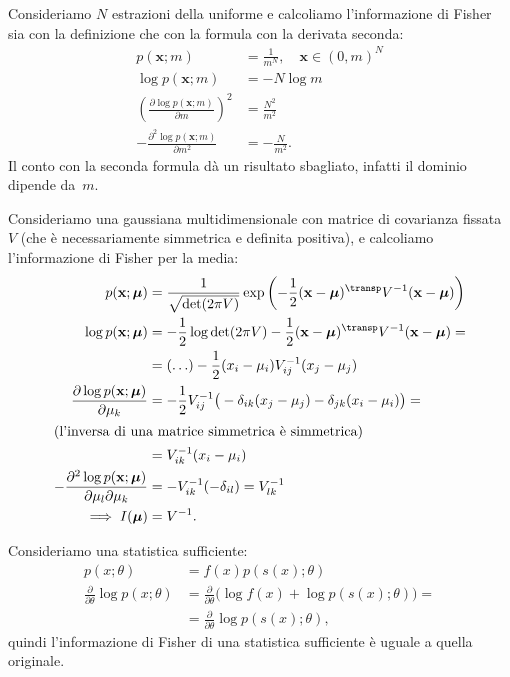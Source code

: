 \begin{example}
	Consideriamo $N$ estrazioni della uniforme e calcoliamo l'informazione di Fisher sia con la definizione che con la formula con la derivata seconda:
	\begin{align*}
		p(\mathbf x;m)
		&= \frac1{m^N}, \quad \mathbf x\in(0,m)^N \\
		\log p(\mathbf x;m)
		&= -N\log m \\
		\left( \frac{\partial\log p(\mathbf x;m)}{\partial m} \right)^2
		&= \frac{N^2}{m^2} \\
		-\frac{\partial^2\log p(\mathbf x;m)}{\partial m^2}
		&= -\frac N{m^2}.
	\end{align*}
	Il conto con la seconda formula dà un risultato sbagliato, infatti il dominio dipende da~$m$.
\end{example}

\begin{example}
	Consideriamo una gaussiana multidimensionale con matrice di covarianza fissata $V$ (che è necessariamente simmetrica e definita positiva), e calcoliamo l'informazione di Fisher per la media:
	\begin{align*}
		p(\mathbf x;\boldsymbol \mu)
		&= \frac1{\sqrt{\det(2\pi V)}}
		\exp \left( -\frac12 (\mathbf x-\boldsymbol\mu)^\transp V^{-1} (\mathbf x-\boldsymbol\mu) \right) \\
		\log p(\mathbf x;\boldsymbol\mu)
		&= -\frac12\log\det(2\pi V)
		- \frac12 (\mathbf x-\boldsymbol\mu)^\transp V^{-1} (\mathbf x-\boldsymbol\mu) = \\
		&= (\ldots) - \frac12 (x_i-\mu_i)V^{-1}_{ij}(x_j-\mu_j) \\
		\frac{\partial\log p(\mathbf x;\boldsymbol\mu)}{\partial\mu_k}
		&= -\frac12 V^{-1}_{ij} \big( -\delta_{ik}(x_j-\mu_j) - \delta_{jk}(x_i-\mu_i) \big) = \\
		\intertext{(l'inversa di una matrice simmetrica è simmetrica)}
		&= V^{-1}_{ik}(x_i-\mu_i) \\
		-\frac{\partial^2\log p(\mathbf x;\boldsymbol\mu)}{\partial\mu_l\partial\mu_k}
		&= -V^{-1}_{ik}(-\delta_{il}) = V^{-1}_{lk} \\
		\implies I(\boldsymbol\mu) &= V^{-1}.
	\end{align*}
\end{example}

Consideriamo una statistica sufficiente:
\begin{align*}
	p(x;\theta)
	&= f(x)p(s(x);\theta) \\
	\frac{\partial}{\partial\theta}\log p(x;\theta)
	&= \frac{\partial}{\partial\theta} \big( \log f(x) + \log p(s(x);\theta) \big) = \\
	&= \frac{\partial}{\partial\theta}\log p(s(x);\theta),
\end{align*}
quindi l'informazione di Fisher di una statistica sufficiente è uguale a quella originale.

